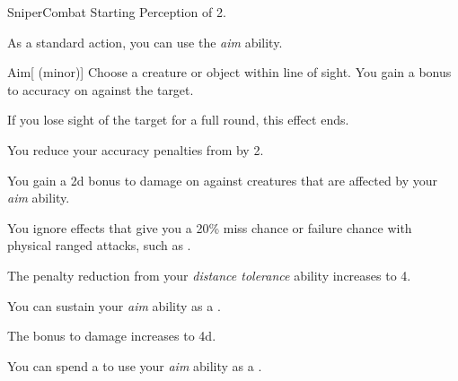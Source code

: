     \begin{feat}{Sniper}{Combat}
        \featpre Starting Perception of 2.

         As a standard action, you can use the \textit{aim} ability.
        \begin{ability}{Aim}[ (minor)]
            Choose a creature or object within line of sight.
            You gain a  bonus to accuracy on  against the target.

            If you lose sight of the target for a full round, this effect ends.
        \end{ability}

         You reduce your accuracy penalties from  by 2.

         You gain a \plus2d bonus to damage on  against \unaware creatures that are affected by your \textit{aim} ability.

         You ignore effects that give you a 20\% miss chance or failure chance with physical ranged attacks, such as .

         The penalty reduction from your \textit{distance tolerance} ability increases to 4.

         You can sustain your \textit{aim} ability as a .

         The bonus to damage increases to \plus4d.

         You can spend a  to use your \textit{aim} ability as a .
    \end{feat}

